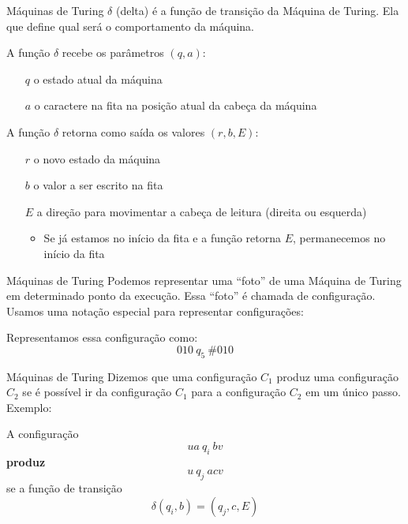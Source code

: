 \documentclass{beamer}
\begin{document}
\begin{frame}{Máquinas de Turing}
	$\delta$ (delta) é a função de transição da Máquina de Turing. Ela que define qual será o comportamento da máquina.
	
	A função $\delta$ recebe os parâmetros $(q,a)$:
	\begin{itemize}
		\item [$q$] o estado atual da máquina
		\item [$a$] o caractere na fita na posição atual da cabeça da máquina
	\end{itemize}
	
	A função $\delta$ retorna como saída os valores $(r,b,E)$:
	\begin{itemize}
		\item [$r$] o novo estado da máquina
		\item [$b$] o valor a ser escrito na fita
		\item [$E$] a direção para movimentar a cabeça de leitura (direita ou esquerda)
		\begin{itemize}
			\item Se já estamos no início da fita e a função retorna $E$, permanecemos no início da fita
		\end{itemize}
	\end{itemize}
\end{frame}
\begin{frame}{Máquinas de Turing}
	Podemos representar uma ``foto'' de uma Máquina de Turing em determinado ponto da execução. Essa ``foto'' é chamada de \alert{configuração}.
	Usamos uma notação especial para representar configurações:
	\begin{center}
		\renewcommand{\TuringInput} {0,1,0,\#,0,1,0,$\sqcup$}
		\renewcommand{\TuringHead} 4
		\renewcommand{\TuringState} {$q_{5}$}
		\renewcommand{\TuringRightEnd} {$\ldots$}
		\renewcommand{\TuringLeftEnd} {}
		\TuringMachine
	\end{center}
	Representamos essa configuração como:
	\begin{equation*}
		010\ q_{5}\ \#010
	\end{equation*}
\end{frame}
\begin{frame}{Máquinas de Turing}
	Dizemos que uma configuração $C_{1}$ \alert{produz} uma configuração $C_{2}$ se é possível ir da configuração $C_{1}$ para a configuração $C_{2}$ em um único passo.
	Exemplo:
	
	A configuração 
	\begin{equation*}
		ua\ q_{i}\ bv
	\end{equation*}
	\textbf{produz}
	\begin{equation*}
		u\ q_{j}\ acv
	\end{equation*}
	se a função de transição
	\begin{equation*}
		\delta(q_{i}, b) = (q_{j}, c, E)
	\end{equation*}
\end{frame}
\end{document}
